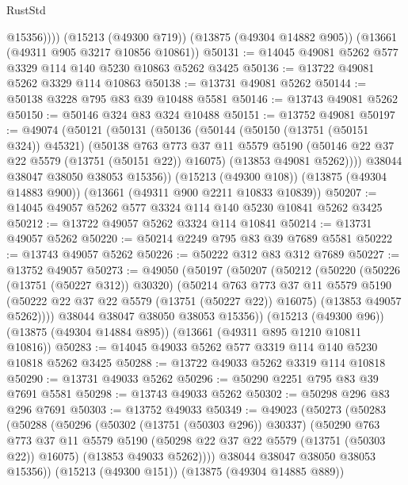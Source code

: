 \begin{lexlean}{RustStd}
\begin{coremodule}
            @15356))))
    (@15213 (@49300 @719))
    (@13875 (@49304 @14882 @905))
    (@13661 (@49311 @905 @3217 @10856 @10861))
@50131 := @14045 @49081 @5262 @577 @3329 @114 @140 @5230 @10863 @5262 @3425
@50136 := @13722 @49081 @5262 @3329 @114 @10863
@50138 := @13731 @49081 @5262
@50144 := @50138 @3228 @795 @83 @39 @10488 @5581
@50146 := @13743 @49081 @5262
@50150 := @50146 @324 @83 @324 @10488
@50151 := @13752 @49081
@50197 := @49074
    (@50121
      (@50131
        (@50136
          (@50144
            (@50150 (@13751 (@50151 @324)) @45321)
            (@50138
              @763
              @773
              @37
              @11
              @5579
              @5190
              (@50146 @22 @37 @22 @5579 (@13751 (@50151 @22)) @16075)
              (@13853 @49081 @5262))))
        @38044
        @38047
        @38050
        @38053
        @15356))
    (@15213 (@49300 @108))
    (@13875 (@49304 @14883 @900))
    (@13661 (@49311 @900 @2211 @10833 @10839))
@50207 := @14045 @49057 @5262 @577 @3324 @114 @140 @5230 @10841 @5262 @3425
@50212 := @13722 @49057 @5262 @3324 @114 @10841
@50214 := @13731 @49057 @5262
@50220 := @50214 @2249 @795 @83 @39 @7689 @5581
@50222 := @13743 @49057 @5262
@50226 := @50222 @312 @83 @312 @7689
@50227 := @13752 @49057
@50273 := @49050
    (@50197
      (@50207
        (@50212
          (@50220
            (@50226 (@13751 (@50227 @312)) @30320)
            (@50214
              @763
              @773
              @37
              @11
              @5579
              @5190
              (@50222 @22 @37 @22 @5579 (@13751 (@50227 @22)) @16075)
              (@13853 @49057 @5262))))
        @38044
        @38047
        @38050
        @38053
        @15356))
    (@15213 (@49300 @96))
    (@13875 (@49304 @14884 @895))
    (@13661 (@49311 @895 @1210 @10811 @10816))
@50283 := @14045 @49033 @5262 @577 @3319 @114 @140 @5230 @10818 @5262 @3425
@50288 := @13722 @49033 @5262 @3319 @114 @10818
@50290 := @13731 @49033 @5262
@50296 := @50290 @2251 @795 @83 @39 @7691 @5581
@50298 := @13743 @49033 @5262
@50302 := @50298 @296 @83 @296 @7691
@50303 := @13752 @49033
@50349 := @49023
    (@50273
      (@50283
        (@50288
          (@50296
            (@50302 (@13751 (@50303 @296)) @30337)
            (@50290
              @763
              @773
              @37
              @11
              @5579
              @5190
              (@50298 @22 @37 @22 @5579 (@13751 (@50303 @22)) @16075)
              (@13853 @49033 @5262))))
        @38044
        @38047
        @38050
        @38053
        @15356))
    (@15213 (@49300 @151))
    (@13875 (@49304 @14885 @889))

\end{coremodule}
\end{lexlean}
